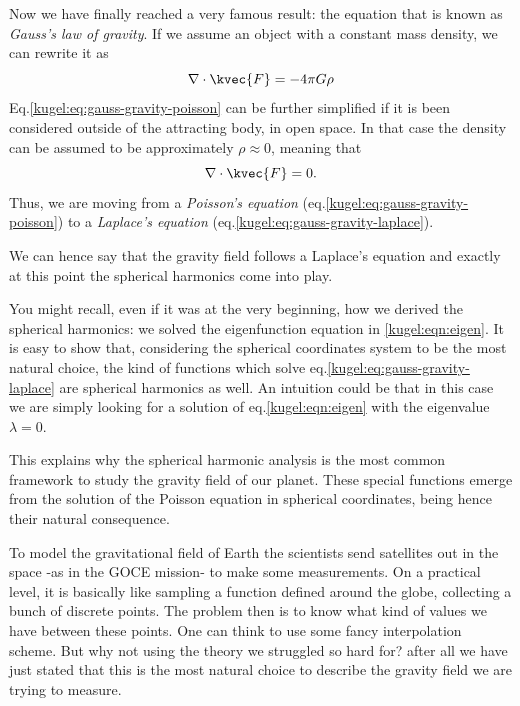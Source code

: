 Now we have finally reached a very famous result: the equation that is known as \emph{Gauss's law of gravity}. 
If we assume an object with a constant mass density, we can rewrite it as
\begin{equation}
  \nabla \cdot \kvec{F} = -4\pi G \rho \label{kugel:eq:gauss-gravity-poisson}
\end{equation}
Eq.\eqref{kugel:eq:gauss-gravity-poisson} can be further simplified if it is been considered outside of the attracting body, in open space.
In that case the density can be assumed to be approximately $\rho \approx 0$, meaning that
\begin{equation}
  \nabla \cdot \kvec{F} = 0 \label{kugel:eq:gauss-gravity-laplace}.
\end{equation}
Thus, we are moving from a \emph{Poisson's equation} (eq.\eqref{kugel:eq:gauss-gravity-poisson}) to a \emph{Laplace's equation} (eq.\eqref{kugel:eq:gauss-gravity-laplace}).

We can hence say that the gravity field follows a Laplace's equation and exactly at this point the spherical harmonics come into play. 

You might recall, even if it was at the very beginning, how we derived the spherical harmonics: we solved the eigenfunction equation in \eqref{kugel:eqn:eigen}. 
It is easy to show that, considering the spherical coordinates system to be the most natural choice, the kind of functions which solve 
eq.\eqref{kugel:eq:gauss-gravity-laplace} are spherical harmonics as well. An intuition could be that in this case we are simply 
looking for a solution of eq.\eqref{kugel:eqn:eigen} with the eigenvalue $\lambda=0$.

This explains why the spherical harmonic analysis is the most common framework to study the gravity field of our planet. These special 
functions emerge from the solution of the Poisson equation in spherical coordinates, being hence their natural consequence. 

To model the gravitational field of Earth the scientists send satellites out in the space -as in the GOCE mission- to make some measurements. 
On a practical level, it is basically like sampling a function defined around the globe, collecting a bunch of discrete points. 
The problem then is to know what kind of values we have between these points. One can think to use some fancy interpolation scheme. 
But why not using the theory we struggled so hard for? after all we have just stated that this is the most natural choice to 
describe the gravity field we are trying to measure.

